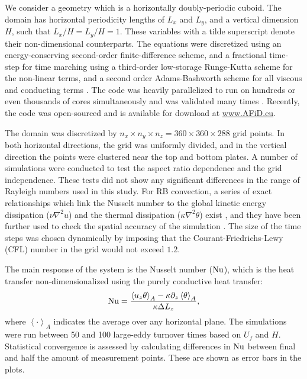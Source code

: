We consider a geometry which is a horizontally doubly-periodic cuboid. The
domain has horizontal periodicity lengths of $L_x$ and $L_y$, and a vertical
dimension $H$, such that $L_x/H = L_y/H = 1$.  These variables with a tilde
superscript denote their non-dimensional counterparts.  The equations were
discretized using an energy-conserving second-order finite-difference scheme,
and a fractional time-step for time marching using a third-order low-storage
Runge-Kutta scheme for the non-linear terms, and a second order
Adams-Bashworth scheme for all viscous and conducting terms
\citep{Verzicco1996,vanderPoel2015}.  The code was heavily parallelized to run
on hundreds or even thousands of cores simultaneously and was validated many
times \citep{Stevens2010,Stevens2011, vanderPoel2015}.  Recently, the code was
open-sourced and is available for download at \url{www.AFiD.eu}.

The domain was discretized by $n_x \times n_y \times n_z = 360 \times 360
\times 288$ grid points.  In both horizontal directions, the grid was
uniformly divided, and in the vertical direction the points were clustered
near the top and bottom plates.  A number of simulations were conducted to
test the aspect ratio dependence and the grid independence.  These tests did
not show any significant differences in the range of Rayleigh numbers used in
this study.  For RB convection, a series of exact relationships which link the
Nusselt number to the global kinetic energy dissipation ($\nu \nabla^2 u$) and
the thermal dissipation ($\kappa \nabla^2 \theta$) exist
\citep{Shraiman1990,Ahlers2009},
and they have been further used to check the spatial accuracy of the
simulation \citep{Stevens2010}.  The size of the time steps was chosen
dynamically by imposing that the Courant-Friedrichs-Lewy (CFL) number in the
grid would not exceed $1.2$.%

The main response of the system is the Nusselt number ($\text{Nu}$), which is the
heat transfer non-dimensionalized using the purely conductive heat transfer:%
\begin{equation}
    \text{Nu} = \frac{\left< u_z \theta\right>_A - \kappa\partial_z
    \left<\theta\right>_A}{\kappa \Delta L_z}, 
\end{equation}
where $\left<\cdot \right>_A$ indicates the average over any horizontal plane.
The simulations were run between 50 and 100 large-eddy turnover times based on
$U_f$ and $H$. Statistical convergence is assessed by calculating
differences in $\text{Nu}$ between final and half the amount of measurement
points. These are shown as error bars in the plots.

